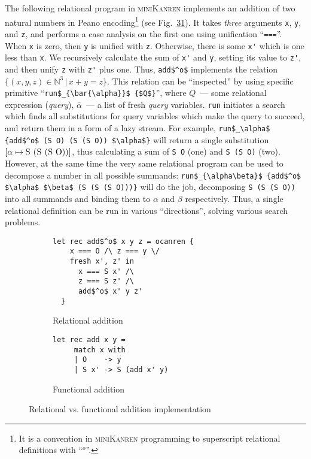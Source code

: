The following relational program in \textsc{miniKanren} implements an addition of two natural numbers in Peano encoding\footnote{It is a
convention in \textsc{miniKanren} programming to superscript relational definitions with ``$^o$''.} (see Fig.~\ref{addition}\ref{rel-add}).
It takes \emph{three} arguments \lstinline|x|, \lstinline|y|, and \lstinline|z|, and performs a
case analysis on the first one using unification ``\lstinline[language=ocanren]|===|''. When
\lstinline|x| is zero, then \lstinline|y| is unified with \lstinline|z|. Otherwise, there is some
\lstinline|x'| which is one less than \lstinline|x|. We recursively calculate the sum of \lstinline|x'| and
\lstinline|y|, setting its value to \lstinline|z'|, and then unify \lstinline|z| with \lstinline|z'| plus one. Thus,
\lstinline[mathescape=true]|add$^o$| implements the relation $\{(x, y, z)\in\mathbb{N}^3\, |\, x+y=z\}$. This relation can
be ``inspected'' by using specific primitive ``\lstinline[language=ocanren]|run$_{\bar{\alpha}}$ {$Q$}|'', where
$Q$~--- some relational expression (\emph{query}), $\bar{\alpha}$~--- a list of fresh \emph{query} variables.
\lstinline[language=ocanren]|run| initiates a search which finds all substitutions for query variables which
make the query to succeed, and return them in a form of a lazy stream. For example, \lstinline[language=ocanren,basicstyle=\small]|run$_\alpha$ {add$^o$ (S O) (S (S O)) $\alpha$}|
will return a single substitution $[\alpha\mapsto \mbox{\lstinline|S (S (S O))|}]$, thus calculating a
sum of \lstinline|S O| (one) and \lstinline|S (S O)| (two). However, at the same time the very same relational
program can be used to decompose a number in all possible summands: \lstinline[language=ocanren,basicstyle=\small]|run$_{\alpha\beta}$ {add$^o$ $\alpha$ $\beta$ (S (S (S O)))}|
will do the job, decomposing \lstinline|S (S (S O))| into all summands and binding them to $\alpha$ and $\beta$ respectively.
Thus, a single relational definition can be run in various ``directions'', solving various search problems.

\begin{figure}[t]
  \centering
  \begin{subfigure}[t]{0.4\textwidth}    
\begin{lstlisting}[language=ocanren,basicstyle=\small]
  let rec add$^o$ x y z = ocanren {
    x === O /\ z === y \/
    fresh x', z' in
      x === S x' /\
      z === S z' /\
      add$^o$ x' y z'
  }
\end{lstlisting}
\caption{Relational addition}
\label{rel-add}
  \end{subfigure}
  \hfill
  \begin{subfigure}[t]{0.4\textwidth}
\begin{lstlisting}[language=ocanren,basicstyle=\small]
   let rec add x y =
     match x with
     | O    -> y
     | S x' -> S (add x' y)     
\end{lstlisting}
\vskip12mm
\caption{Functional addition}
\label{fun-add}
  \end{subfigure}
  \vskip5mm
  \caption{Relational vs. functional addition implementation}
  \label{addition}
\end{figure}

